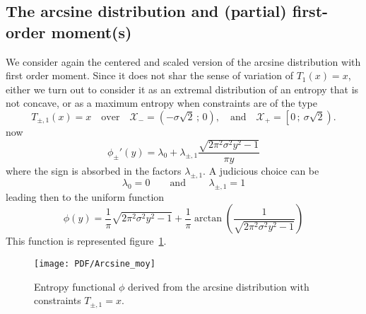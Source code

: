 \documentclass[english,onecolumn]{elsarticle}
\def\X{\mathcal{X}}
\begin{document}
%


\subsection{The arcsine distribution and (partial) first-order moment(s)}
\label{subsec:ArcsineFirstOrder}

We consider  again the centered and  scaled version of  the arcsine distribution
with  first order  moment. Since  it does  not shar  the sense  of  variation of
$T_1(x) = x$, either  we turn out to consider it as  an extremal distribution of
an entropy that is not concave, or  as a maximum entropy when constraints are of
the type
%
\[
T_{\pm,1}(x) = x \quad \mbox{over} \quad \X_- = \left( -\sigma\sqrt2 \, ; \, 0
\right), \quad \mbox{and} \quad \X_+ = \left[0 \, ; \: \sigma \sqrt2 \right).
\]
%
now
%
\[
\phi_{\pm}'(y) = \lambda_0 + \lambda_{\pm,1} \frac{\sqrt{2 \pi^2 \sigma^2 y^2 -
1}}{\pi y}
\]
%
where the sign is absorbed  in the factors $\lambda_{\pm,1}$. A judicious choice
can be
%
\[
\lambda_0 = 0 \qquad \mbox{and } \qquad \lambda_{\pm,1} = 1
\]
%
leading then to the uniform function
%
\[
\phi(y) = \frac{1}{\pi} \sqrt{2 \pi^2 \sigma^2 y^2 - 1} + \frac{1}{\pi} \arctan
\left( \frac{1}{\sqrt{2 \pi^2 \sigma^2 y^2 - 1}} \right)
\]
%
This  function  is represented  figure~\ref{fig:Entropy-arcsin-moy}.
%
\begin{figure}[htbp]
\centerline{\texttt{[image: PDF/Arcsine\_moy]}}
%
\caption{Entropy  functional   $\phi$  derived   from   the  arcsine
  distribution with constraints $T_{\pm,1} =  x$.}
\label{fig:Entropy-arcsin-moy}
\end{figure}
\end{document}
